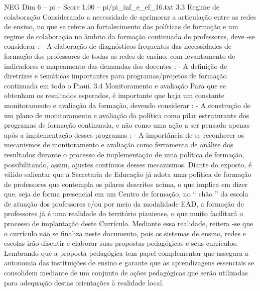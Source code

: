 \begin{textsample}{NEG Dim 6 – pi – Score 1.00 – pi/pi\_inf\_e\_ef\_16.txt}  \label{ex:f6_neg_096}
3.3 Regime de colaboração Considerando a necessidade de aprimorar a articulação entre as redes de ensino, no que se refere ao fortalecimento das políticas de formação e um regime de colaboração no âmbito da formação continuada de professores, deve -se considerar : - A elaboração de diagnósticos frequentes das necessidades de formação dos professores de todas as redes de ensino, com levantamento de indicadores e mapeamento das demandas dos docentes ; - A definição de diretrizes e temáticas importantes para programas/projetos de formação continuada em todo o Piauí. 3.4 Monitoramento e avaliação Para que se obtenham os resultados esperados, é importante que haja um constante monitoramento e avaliação da formação, devendo considerar : - A construção de um plano de monitoramento e avaliação da política como pilar estruturante dos programas de formação continuada, e não como uma ação a ser pensada apenas após a implementação desses programas ; - A importância de se reconhecer os mecanismos de monitoramento e avaliação como ferramenta de análise dos resultados durante o processo de implementação de uma política de formação, possibilitando, assim, ajustes contínuos desses mecanismos.
Diante do exposto, é válido salientar que a Secretaria de Educação já adota uma política de formação de professores que contempla os pilares descritos acima, o que implica em dizer que, seja de forma presencial em um Centro de formação, no “ chão ” da escola de atuação dos professores e/ou por meio da modalidade EAD, a formação de professores já é uma realidade do território piauiense, o que muito facilitará o processo de implantação deste Currículo.
Mediante essa realidade, reitera -se que o currículo não se finaliza neste documento, pois os sistemas de ensino, redes e escolas irão discutir e elaborar suas propostas pedagógicas e seus currículos.
Lembrando que a proposta pedagógica tem papel complementar que assegura a autonomia das instituições de ensino e garante que as aprendizagens essenciais se consolidem mediante de um conjunto de ações pedagógicas que serão utilizadas para adequação destas orientações à realidade local.

\end{textsample}
